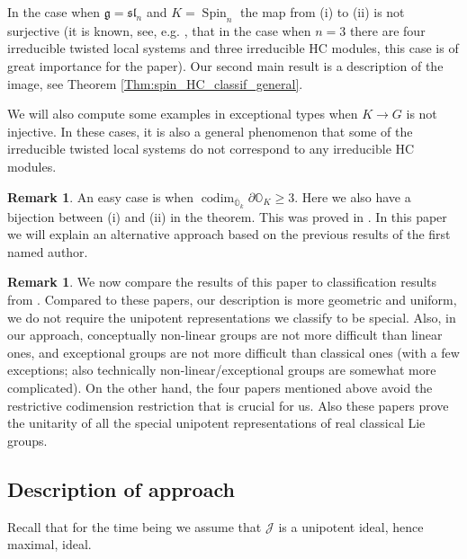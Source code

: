 \documentclass[12pt]{amsart}
\newcommand{\J}{\mathcal{J}}
\newcommand{\g}{\mathfrak{g}}
\newcommand{\Orb}{\mathbb{O}}
\newcommand{\slf}{\mathfrak{sl}}
\theoremstyle{definition}
\newtheorem{Rem}[Thm]{Remark}
\numberwithin{equation}{section}
\begin{document}
In the case when $\g=\slf_n$ and $K=\operatorname{Spin}_n$ the map from (i) to (ii)
is not surjective (it is known, see, e.g. \cite[Example 12.4]{Vogan}, that in the case when $n=3$ there are four irreducible twisted local
systems and three irreducible HC modules, this case  is of great importance for the paper). 
Our second main result is a description of the image, see Theorem \ref{Thm:spin_HC_classif_general}.

We will also compute some examples in exceptional types when $K\rightarrow G$
is not injective. In these cases, it is also a general phenomenon that some of the irreducible twisted local systems do not correspond to any irreducible HC modules.

\begin{Rem}
An easy case is when $\operatorname{codim}_{\overline{\Orb}_k}\partial\Orb_K\geqslant 3$.
Here we also have a bijection between (i) and (ii) in the theorem. This was proved
in \cite{LY}. In this paper we will explain an alternative approach based on the
previous results of the first named author.
\end{Rem}

\begin{Rem}
We now compare the results of this paper to classification results
from \cite{BMSZ1,BMSZ2,BMSZ3,BMSZ4}. Compared to these papers, our description is more geometric and uniform, we do not require the unipotent representations we classify to be special. Also, in our approach, conceptually
non-linear groups are not more difficult than linear ones, and exceptional groups are not more
difficult than classical ones (with a few exceptions; also technically non-linear/exceptional groups are somewhat
more complicated). On the other hand, the four papers mentioned above avoid the restrictive codimension restriction
that is crucial for us. Also these papers prove the unitarity of all the special unipotent representations of real classical Lie groups.
\end{Rem}

\subsection{Description of approach}\label{SS_intro_approach}
Recall that for the time being we assume that $\J$ is a unipotent ideal, hence maximal, ideal.
\end{document}
